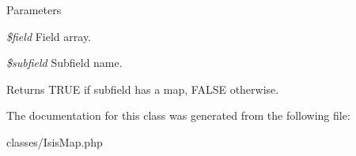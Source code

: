 \begin{DoxyParams}{Parameters}
\item[{\em \$field}]Field array.\item[{\em \$subfield}]Subfield name.\end{DoxyParams}
\begin{DoxyReturn}{Returns}
TRUE if subfield has a map, FALSE otherwise. 
\end{DoxyReturn}


The documentation for this class was generated from the following file:\begin{DoxyCompactItemize}
\item 
classes/IsisMap.php\end{DoxyCompactItemize}
